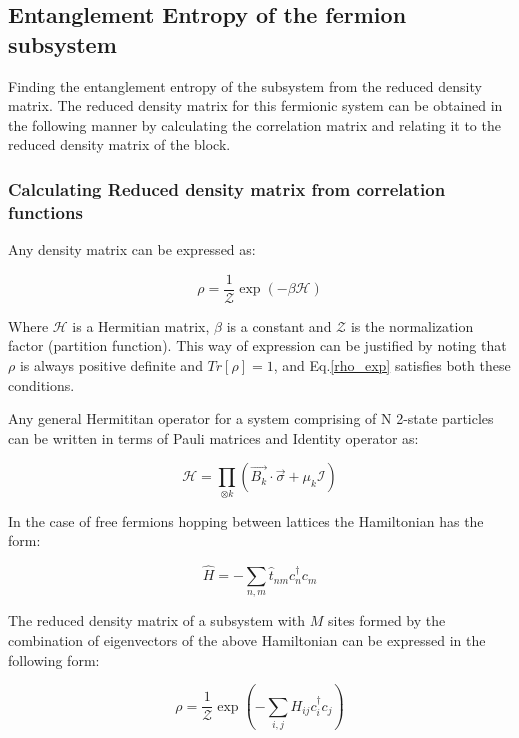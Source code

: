 \documentclass[11pt,a4paper]{article}
\begin{document}
	
		
		
		\subsection{Entanglement Entropy of the fermion subsystem}
		Finding the entanglement entropy of the subsystem from the reduced density matrix\cite{Peschel_2009}. The reduced density matrix for this fermionic system can be obtained in the following manner\cite{Peschel_2003} by calculating the correlation matrix    \cite{Latorre_2009} and relating it to the reduced density matrix of the block. 
		
\subsubsection{Calculating Reduced density matrix from correlation functions}		

Any density matrix can be expressed as:

\begin{equation}\label{rho_exp}
\rho = \dfrac{1}{\mathcal{Z}}\exp(-\beta \mathcal{H})
\end{equation}

Where $ \mathcal{H} $ is a Hermitian matrix, $ \beta $ is a constant and $ \mathcal{Z} $ is the normalization factor (partition function). This way of expression can be justified by noting that $ \rho $ is always positive definite and $ Tr[\rho] = 1 $, and Eq.\eqref{rho_exp} satisfies both these conditions. 

Any general Hermititan operator for a system comprising of N 2-state particles can be written in terms of Pauli matrices and Identity operator as:

\begin{equation}\label{key}
\mathcal{H} = \prod_{\otimes k}(\vec{B_{k}}\cdot\vec{\sigma}+\mu_{k}\mathcal{I})
\end{equation} 

In the case of free fermions hopping between lattices the Hamiltonian has the form: 

\begin{equation}\label{key}
\hat{H}  = - \sum_{n,m} \hat{t}_{nm}c_{n}^\dagger c_{m}
\end{equation}

The reduced density matrix of a subsystem with $ M $ sites formed by the combination of eigenvectors of the above Hamiltonian can be expressed in the following form:

\begin{equation}\label{key}
\rho  = \dfrac{1}{\mathcal{Z}} \exp(-\sum_{i,j}H_{ij}c_{i}^\dagger c_{j})
\end{equation}
\end{document}
